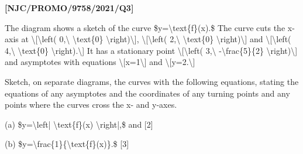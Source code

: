 \item \textbf{{[}NJC/PROMO/9758/2021/Q3{]} }

The diagram shows a sketch of the curve \$y=\textbackslash text\{f\}(x).\$
The curve cuts the x-axis at \textbackslash{[}\textbackslash left(
0,\textbackslash{} \textbackslash text\{0\} \textbackslash right)\textbackslash{]},
\textbackslash{[}\textbackslash left( 2,\textbackslash{} \textbackslash text\{0\}
\textbackslash right)\textbackslash{]} and \textbackslash{[}\textbackslash left(
4,\textbackslash{} \textbackslash text\{0\} \textbackslash right).\textbackslash{]}
It has a stationary point \textbackslash{[}\textbackslash left(
3,\textbackslash{} -\textbackslash frac\{5\}\{2\} \textbackslash right)\textbackslash{]}
and asymptotes with equations \textbackslash{[}x=1\textbackslash{]}
and \textbackslash{[}y=2.\textbackslash{]}

Sketch, on separate diagrams, the curves with the following equations,
stating the equations of any asymptotes and the coordinates of any
turning points and any points where the curves cross the x- and y-axes.

(a) \$y=\textbackslash left| \textbackslash text\{f\}(x) \textbackslash right|,\$
and {[}2{]}

(b) \$y=\textbackslash frac\{1\}\{\textbackslash text\{f\}(x)\}.\$
{[}3{]}
